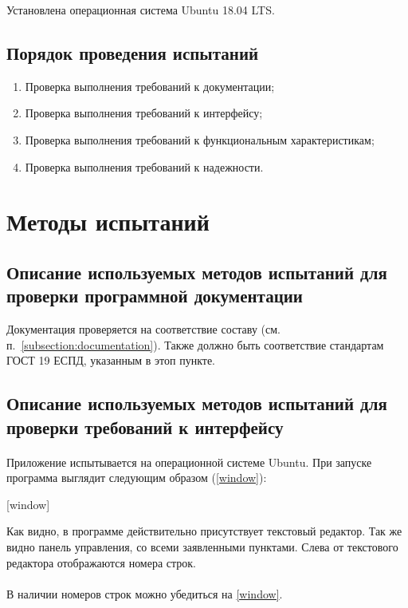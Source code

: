\documentclass[testmethods]{espd}
\begin{document}
Установлена операционная система Ubuntu 18.04 LTS.

\subsection{Порядок проведения испытаний}
\begin{enumerate}
\item Проверка выполнения требований к документации;
\item Проверка выполнения требований к интерфейсу;
\item Проверка выполнения требований к функциональным характеристикам;
\item Проверка выполнения требований к надежности.
\end{enumerate}

\section{Методы испытаний}
\subsection{Описание используемых методов испытаний для проверки программной документации}
Документация проверяется на соответствие составу (см. п.~\ref{subsection:documentation}). Также должно быть соответствие стандартам ГОСТ 19 ЕСПД, указанным в этоп пункте.

\subsection{Описание используемых методов испытаний для проверки требований к интерфейсу}

\paragraph{}\label{paragraph:window}
Приложение испытывается на операционной системе Ubuntu. При запуске программа выглядит следующим образом (\ref{window}):

[window]

Как видно, в программе действительно присутствует текстовый редактор. Так же видно панель управления, со всеми заявленными пунктами. Слева от текстового редактора отображаются номера строк.

\paragraph{}
В наличии номеров строк можно убедиться на \ref{window}.
\end{document}
